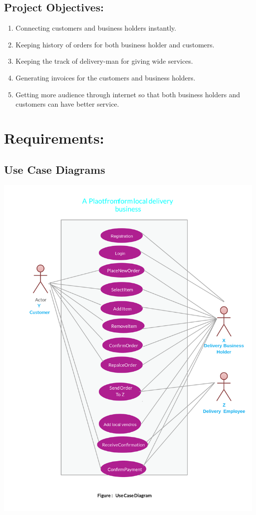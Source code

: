 \documentclass[13pt]{extarticle}
\begin{document}
\subsection{Project Objectives:}
\begin{enumerate}
  \item Connecting customers and business holders instantly.
  \item Keeping history of orders for both business holder and customers.
  \item Keeping the track of delivery-man for giving wide services.
  \item Generating invoices for the customers and business holders.
  \item Getting more audience through internet so that both business holders and customers can have better service.
\end{enumerate}
\newpage

\section{\textbf{Requirements:}}
\subsection{Use Case Diagrams}
\includegraphics[scale = 0.25]{usecase.png}\\[1.0 cm]	
\newpage
\end{document}

